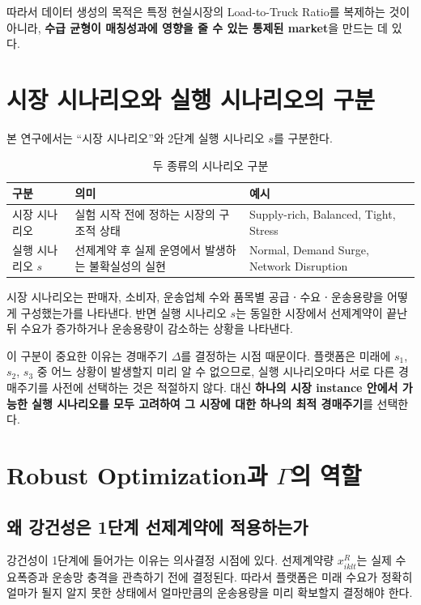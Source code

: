 \documentclass[11pt,a4paper]{article}
\begin{document}
따라서 데이터 생성의 목적은 특정 현실시장의 Load-to-Truck Ratio를 복제하는 것이 아니라,
\textbf{수급 균형이 매칭성과에 영향을 줄 수 있는 통제된 market}을 만드는 데 있다.

\section{시장 시나리오와 실행 시나리오의 구분}

본 연구에서는 ``시장 시나리오''와 2단계 실행 시나리오 $s$를 구분한다.

\begin{table}[h!]
\centering
\caption{두 종류의 시나리오 구분}
\begin{tabular}{p{}p{}p{}}
\toprule
\textbf{구분} & \textbf{의미} & \textbf{예시} \\
\midrule
시장 시나리오 & 실험 시작 전에 정하는 시장의 구조적 상태 & Supply-rich, Balanced, Tight, Stress \\
실행 시나리오 $s$ & 선제계약 후 실제 운영에서 발생하는 불확실성의 실현 & Normal, Demand Surge, Network Disruption \\
\bottomrule
\end{tabular}
\end{table}

시장 시나리오는 판매자, 소비자, 운송업체 수와 품목별 공급ㆍ수요ㆍ운송용량을 어떻게 구성했는가를 나타낸다.
반면 실행 시나리오 $s$는 동일한 시장에서 선제계약이 끝난 뒤
수요가 증가하거나 운송용량이 감소하는 상황을 나타낸다.

이 구분이 중요한 이유는 경매주기 $\Delta$를 결정하는 시점 때문이다.
플랫폼은 미래에 $s_1$, $s_2$, $s_3$ 중 어느 상황이 발생할지 미리 알 수 없으므로,
실행 시나리오마다 서로 다른 경매주기를 사전에 선택하는 것은 적절하지 않다.
대신 \textbf{하나의 시장 instance 안에서 가능한 실행 시나리오를 모두 고려하여
그 시장에 대한 하나의 최적 경매주기}를 선택한다.

\section{Robust Optimization과 $\Gamma$의 역할}

\subsection{왜 강건성은 1단계 선제계약에 적용하는가}

강건성이 1단계에 들어가는 이유는 의사결정 시점에 있다.
선제계약량 $x^R_{iklt}$는 실제 수요폭증과 운송망 충격을 관측하기 전에 결정된다.
따라서 플랫폼은 미래 수요가 정확히 얼마가 될지 알지 못한 상태에서
얼마만큼의 운송용량을 미리 확보할지 결정해야 한다.
\end{document}
